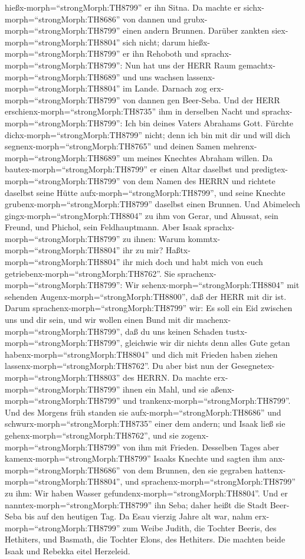 hießx-morph=``strongMorph:TH8799'' er ihn Sitna.  Da machte
er sichx-morph=``strongMorph:TH8686'' von dannen und
grubx-morph=``strongMorph:TH8799'' einen andern Brunnen. Darüber zankten
siex-morph=``strongMorph:TH8804'' sich nicht; darum
hießx-morph=``strongMorph:TH8799'' er ihn Rehoboth und
sprachx-morph=``strongMorph:TH8799'': Nun hat uns der HERR Raum
gemachtx-morph=``strongMorph:TH8689'' und uns wachsen
lassenx-morph=``strongMorph:TH8804'' im Lande.  Darnach zog
erx-morph=``strongMorph:TH8799'' von dannen gen Beer-Seba. 
Und der HERR erschienx-morph=``strongMorph:TH8735'' ihm in derselben
Nacht und sprachx-morph=``strongMorph:TH8799'': Ich bin deines Vaters
Abrahams Gott. Fürchte dichx-morph=``strongMorph:TH8799'' nicht; denn
ich bin mit dir und will dich segnenx-morph=``strongMorph:TH8765'' und
deinen Samen mehrenx-morph=``strongMorph:TH8689'' um meines Knechtes
Abraham willen.  Da bautex-morph=``strongMorph:TH8799'' er
einen Altar daselbst und predigtex-morph=``strongMorph:TH8799'' von dem
Namen des HERRN und richtete daselbst seine Hütte
aufx-morph=``strongMorph:TH8799'', und seine Knechte
grubenx-morph=``strongMorph:TH8799'' daselbst einen Brunnen.
 Und Abimelech gingx-morph=``strongMorph:TH8804'' zu ihm
von Gerar, und Ahussat, sein Freund, und Phichol, sein Feldhauptmann.
 Aber Isaak sprachx-morph=``strongMorph:TH8799'' zu ihnen:
Warum kommtx-morph=``strongMorph:TH8804'' ihr zu mir?
Haßtx-morph=``strongMorph:TH8804'' ihr mich doch und habt mich von euch
getriebenx-morph=``strongMorph:TH8762''.  Sie
sprachenx-morph=``strongMorph:TH8799'': Wir
sehenx-morph=``strongMorph:TH8804'' mit sehenden
Augenx-morph=``strongMorph:TH8800'', daß der HERR mit dir ist. Darum
sprachenx-morph=``strongMorph:TH8799'' wir: Es soll ein Eid zwischen uns
und dir sein, und wir wollen einen Bund mit dir
machenx-morph=``strongMorph:TH8799'',  daß du uns keinen
Schaden tustx-morph=``strongMorph:TH8799'', gleichwie wir dir nichts
denn alles Gute getan habenx-morph=``strongMorph:TH8804'' und dich mit
Frieden haben ziehen lassenx-morph=``strongMorph:TH8762''. Du aber bist
nun der Gesegnetex-morph=``strongMorph:TH8803'' des HERRN. 
Da machte erx-morph=``strongMorph:TH8799'' ihnen ein Mahl, und sie
aßenx-morph=``strongMorph:TH8799'' und
trankenx-morph=``strongMorph:TH8799''.  Und des Morgens
früh standen sie aufx-morph=``strongMorph:TH8686'' und
schwurx-morph=``strongMorph:TH8735'' einer dem andern; und Isaak ließ
sie gehenx-morph=``strongMorph:TH8762'', und sie
zogenx-morph=``strongMorph:TH8799'' von ihm mit Frieden. 
Desselben Tages aber kamenx-morph=``strongMorph:TH8799'' Isaaks Knechte
und sagten ihm anx-morph=``strongMorph:TH8686'' von dem Brunnen, den sie
gegraben hattenx-morph=``strongMorph:TH8804'', und
sprachenx-morph=``strongMorph:TH8799'' zu ihm: Wir haben Wasser
gefundenx-morph=``strongMorph:TH8804''.  Und er
nanntex-morph=``strongMorph:TH8799'' ihn Seba; daher heißt die Stadt
Beer-Seba bis auf den heutigen Tag.  Da Esau vierzig Jahre
alt war, nahm erx-morph=``strongMorph:TH8799'' zum Weibe Judith, die
Tochter Beeris, des Hethiters, und Basmath, die Tochter Elons, des
Hethiters.  Die machten beide Isaak und Rebekka eitel
Herzeleid.


